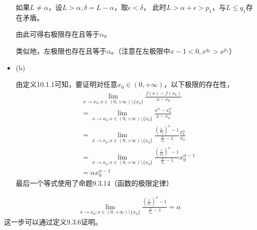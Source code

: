 \documentclass{article}
\begin{document}
\begin{itemize}
        如果$L \neq \alpha$，设$L > \alpha, \delta = L - \alpha$，取$\epsilon < \delta $，
        此时$L > \alpha + \epsilon > p_1$，与$L \leq q_1$存在矛盾。

        由此可得右极限存在且等于$\alpha$。

        类似地，左极限也存在且等于$\alpha$。（注意在左极限中$x - 1 < 0, x^{q_0} > x^{p_1}$）

  \item (b)

        由定义10.1.1可知，要证明对任意$x_0 \in (0, +\infty)$，以下极限的存在性，
        \begin{align*}
           & \lim \limits_{x \to x_0; x \in (0, +\infty) \setminus \{x_0\}} \frac{f(x) - f(x_0)}{x - x_0}                                                    \\
           & = \lim \limits_{x \to x_0; x \in (0, +\infty) \setminus \{x_0\}} \frac{x^{\alpha} - x_0^{\alpha}}{x - x_0}                                      \\
           & = \lim \limits_{x \to x_0; x \in (0, +\infty) \setminus \{x_0\}} \frac{(\frac{x}{x_0})^{\alpha} - 1}{\frac{x}{x_0} - 1}\frac{x_0^{\alpha}}{x_0} \\
           & = \lim \limits_{x \to x_0; x \in (0, +\infty) \setminus \{x_0\}} \frac{(\frac{x}{x_0})^{\alpha} - 1}{\frac{x}{x_0} - 1}x_0^{\alpha - 1}         \\
           & = \alpha x_0^{\alpha - 1}
        \end{align*}
        最后一个等式使用了命题9.3.14（函数的极限定律）

\end{itemize}

\begin{zremark}
  \begin{align*}
    \lim \limits_{x \to x_0; x \in (0, +\infty) \setminus \{x_0\}} \frac{(\frac{x}{x_0})^{\alpha} - 1}{\frac{x}{x_0} - 1} = \alpha
  \end{align*}
  这一步可以通过定义9.3.6证明。
\end{zremark}
\end{document}
